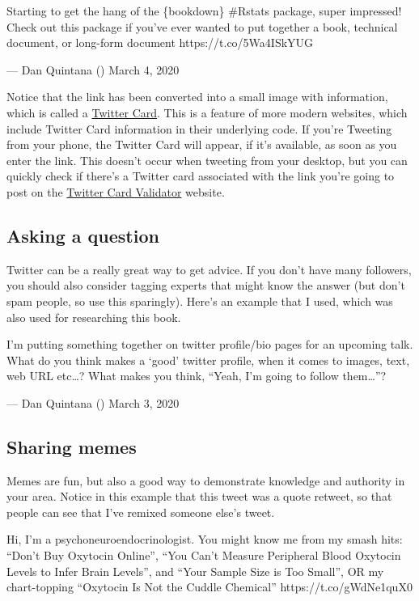 \documentclass[]{book}
\begin{document}
Starting to get the hang of the \{bookdown\} \#Rstats package, super impressed! Check out this package if you've ever wanted to put together a book, technical document, or long-form document https://t.co/5Wa4ISkYUG

--- Dan Quintana (\citet{dsquintana}) March 4, 2020

Notice that the link has been converted into a small image with information, which is called a \href{https://developer.twitter.com/en/docs/tweets/optimize-with-cards/overview/abouts-cards}{Twitter Card}. This is a feature of more modern websites, which include Twitter Card information in their underlying code. If you're Tweeting from your phone, the Twitter Card will appear, if it's available, as soon as you enter the link. This doesn't occur when tweeting from your desktop, but you can quickly check if there's a Twitter card associated with the link you're going to post on the \href{https://cards-dev.twitter.com/validator}{Twitter Card Validator} website.

\hypertarget{asking-a-question}{%
\subsection{Asking a question}\label{asking-a-question}}

Twitter can be a really great way to get advice. If you don't have many followers, you should also consider tagging experts that might know the answer (but don't spam people, so use this sparingly). Here's an example that I used, which was also used for researching this book.

I'm putting something together on twitter profile/bio pages for an upcoming talk. What do you think makes a `good' twitter profile, when it comes to images, text, web URL etc\ldots{}? What makes you think, ``Yeah, I'm going to follow them\ldots{}''?

--- Dan Quintana (\citet{dsquintana}) March 3, 2020

\hypertarget{sharing-memes}{%
\subsection{Sharing memes}\label{sharing-memes}}

Memes are fun, but also a good way to demonstrate knowledge and authority in your area. Notice in this example that this tweet was a quote retweet, so that people can see that I've remixed someone else's tweet.

Hi, I'm a psychoneuroendocrinologist. You might know me from my smash hits: ``Don't Buy Oxytocin Online'', ``You Can't Measure Peripheral Blood Oxytocin Levels to Infer Brain Levels'', and ``Your Sample Size is Too Small'', OR my chart-topping ``Oxytocin Is Not the Cuddle Chemical'' https://t.co/gWdNe1quX0
\end{document}
